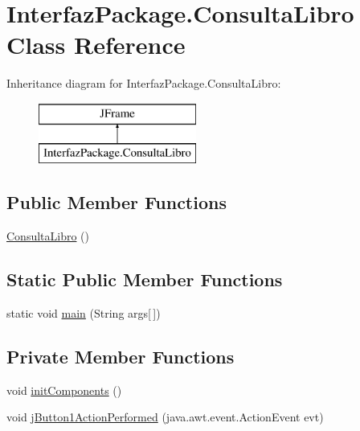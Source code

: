 \hypertarget{class_interfaz_package_1_1_consulta_libro}{}\section{Interfaz\+Package.\+Consulta\+Libro Class Reference}
\label{class_interfaz_package_1_1_consulta_libro}
Inheritance diagram for Interfaz\+Package.\+Consulta\+Libro\+:\begin{figure}[H]
\begin{center}
\leavevmode
\includegraphics[height=2.000000cm]{class_interfaz_package_1_1_consulta_libro}
\end{center}
\end{figure}
\subsection*{Public Member Functions}
\begin{DoxyCompactItemize}
\item 
\mbox{\hyperlink{class_interfaz_package_1_1_consulta_libro_afe8f85b8f90c79821ff3dcecee8f4f5f}{Consulta\+Libro}} ()
\end{DoxyCompactItemize}
\subsection*{Static Public Member Functions}
\begin{DoxyCompactItemize}
\item 
static void \mbox{\hyperlink{class_interfaz_package_1_1_consulta_libro_a848bb4a72481885fa6f42b8431beadee}{main}} (String args\mbox{[}$\,$\mbox{]})
\end{DoxyCompactItemize}
\subsection*{Private Member Functions}
\begin{DoxyCompactItemize}
\item 
void \mbox{\hyperlink{class_interfaz_package_1_1_consulta_libro_a00aa9c22f307fe7c3f2b1e16eb651840}{init\+Components}} ()
\item 
void \mbox{\hyperlink{class_interfaz_package_1_1_consulta_libro_a043c35370f2e4eefae07c77fda717bf7}{j\+Button1\+Action\+Performed}} (java.\+awt.\+event.\+Action\+Event evt)
\end{DoxyCompactItemize}
